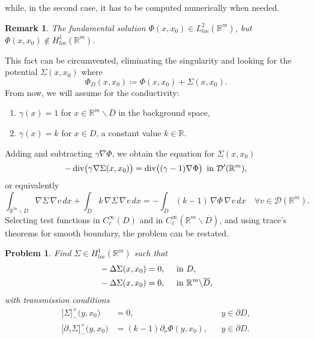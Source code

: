 \documentclass[10pt, a4paper, twoside, openright]{book}
\theoremstyle{definition}
\theoremstyle{plain}
\theoremstyle{plain}
\theoremstyle{plain}
\theoremstyle{plain}
\newtheorem{remark}[subsection]{Remark}
\theoremstyle{plain}
\theoremstyle{plain}
\theoremstyle{plain}
\theoremstyle{plain}
\newtheorem{problem}[subsection]{Problem}
\DeclareMathOperator{\divergence}{div}
\begin{document}
while, in the second case, it has to be computed numerically when needed.
\begin{remark}
 The fundamental solution $\Phi(x,x_0)\in L^2_{loc}(\mathbb{R}^m)$, but $\Phi(x,x_0)\notin H^1_{loc}(\mathbb{R}^m)$.
\end{remark}
This fact can be circumvented, eliminating the singularity and looking for the potential $\Sigma(x,x_0)$ where
\begin{equation}
 \Phi_D(x,x_0)\coloneqq \Phi(x,x_0) + \Sigma(x,x_0).
\end{equation}
From now, we will assume for the conductivity:
\begin{enumerate}
 \item $\gamma(x) = 1$ for $x\in\mathbb{R}^m\backslash\overline{D}$ in the background space,
 \item $\gamma(x) = k$ for $x\in D$, a constant value $k\in \mathbb{R}$.
\end{enumerate}
Adding and subtracting $\gamma\nabla \Phi$, we obtain the equation for $\Sigma(x,x_0)$
\begin{equation}
 -\divergence\bigl(\gamma\nabla \Sigma(x,x_0)\bigr)=\divergence\bigl((\gamma - 1)\nabla\Phi\bigr)\,\textup{ in }\mathcal{D}'(\mathbb{R}^m),
\end{equation}
or equivalently
\begin{equation}
 \int_{\mathbb{R}^m \backslash D}\nabla \Sigma\,\nabla v\, dx + \int_{D} k \, \nabla \Sigma\,\nabla v \, dx = - \int_D(k-1)\,\nabla \Phi\,\nabla v \,dx\quad\forall v \in \mathcal{D}(\mathbb{R}^m).
 \label{eq:variational-F}
\end{equation}
Selecting test functions in $C^\infty_c(D)$ and in $C^\infty_c(\mathbb{R}^m\backslash \overline{D})$, and using trace's theorems for smooth boundary, the problem can be restated.
\begin{problem} Find $\Sigma\in H^1_{loc}(\mathbb{R}^m)$ such that
\begin{align}
 &-\Delta \Sigma(x,x_0) = 0,\quad\textup{ in }D, \label{eq:laplacian-D}\\
 &-\Delta \Sigma(x,x_0) = 0,\quad\textup{ in }\mathbb{R}^m\backslash\overline{D}, \label{eq:laplacian-outside-D}
\end{align}
with \emph{transmission conditions}
\begin{subequations}
\label{eq:transmissionSigma01}
\begin{align}
 \bigl[\Sigma\bigr]^+_-\bigl(y,x_0\bigr) &=0, && y \in\partial D, \label{eq:transmissionF0}\\ 
 \bigl[\partial_\gamma \Sigma\bigr]^+_-\bigl(y,x_0\bigr) &= (k - 1)\partial_\nu \Phi(y,x_0), && y \in\partial D. \label{eq:transmissionF1}
\end{align}
\end{subequations}
\end{problem}
\end{document}
